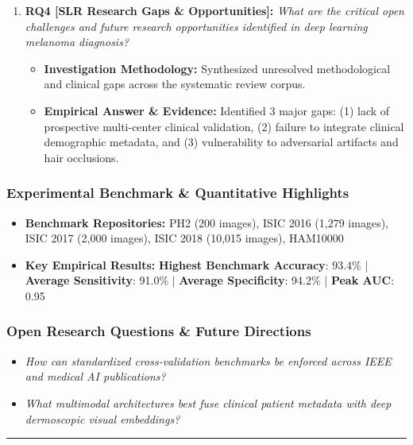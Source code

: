 \begin{enumerate}[label=\textbf{\arabic*.}, leftmargin=*]
\begin{itemize}[leftmargin=1.5em]
  \end{itemize}
  \item \textbf{RQ4 [SLR Research Gaps \& Opportunities]:} \textit{What are the critical open challenges and future research opportunities identified in deep learning melanoma diagnosis?}
  \begin{itemize}[leftmargin=1.5em]
    \item \textbf{Investigation Methodology:} Synthesized unresolved methodological and clinical gaps across the systematic review corpus.
    \item \textbf{Empirical Answer \& Evidence:} Identified 3 major gaps: (1) lack of prospective multi-center clinical validation, (2) failure to integrate clinical demographic metadata, and (3) vulnerability to adversarial artifacts and hair occlusions.
  \end{itemize}
\end{enumerate}

\subsubsection*{Experimental Benchmark \& Quantitative Highlights}
\begin{itemize}[leftmargin=*]
  \item \textbf{Benchmark Repositories:} PH2 (200 images), ISIC 2016 (1,279 images), ISIC 2017 (2,000 images), ISIC 2018 (10,015 images), HAM10000
  \item \textbf{Key Empirical Results:} \textbf{Highest Benchmark Accuracy}: 93.4\% \quad | \quad \textbf{Average Sensitivity}: 91.0\% \quad | \quad \textbf{Average Specificity}: 94.2\% \quad | \quad \textbf{Peak AUC}: 0.95
\end{itemize}

\subsubsection*{Open Research Questions \& Future Directions}
\begin{itemize}[leftmargin=*]
  \item \textit{How can standardized cross-validation benchmarks be enforced across IEEE and medical AI publications?}
  \item \textit{What multimodal architectures best fuse clinical patient metadata with deep dermoscopic visual embeddings?}
\end{itemize}
\vspace{0.8em}\hrule\vspace{1.2em}
